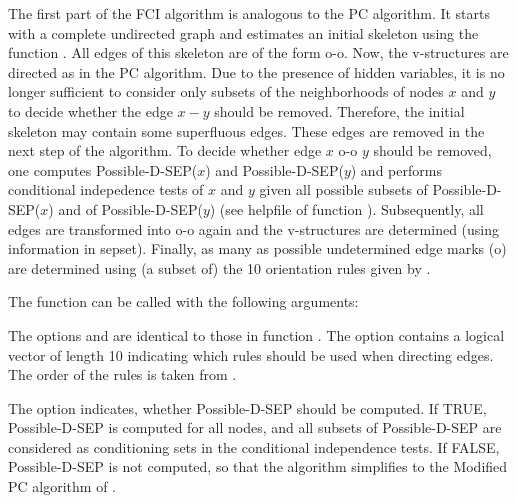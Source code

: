 \documentclass[article]{jss}
\begin{document}
The first part of the FCI algorithm is analogous to the PC algorithm. It
starts with a complete undirected graph and estimates an initial skeleton
using the function . All edges of this skeleton are of the
form o-o. Now, the v-structures are directed as in the PC algorithm. Due to the presence of hidden variables, it is no longer
sufficient to consider only subsets of the neighborhoods of nodes $x$ and
$y$ to decide whether the edge $x-y$ should be removed.  Therefore, the
initial skeleton may contain some superfluous edges.  These edges are
removed in the next step of the algorithm. To decide whether edge $x$ o-o $y$
should be removed, one computes Possible-D-SEP($x$) and Possible-D-SEP($y$)
and performs conditional indepedence tests of $x$ and $y$ given all
possible subsets of Possible-D-SEP($x$) and of Possible-D-SEP($y$) (see
helpfile of function ). Subsequently, all edges are transformed into o-o again and the v-structures are
determined (using information in sepset).  Finally, as many as possible
undetermined edge marks (o) are determined using (a subset of) the 10
orientation rules given by \cite{Zhang08-orientation-rules}.

The function can be called with the following arguments:

     
The options  and  are identical to those in function
. The option  contains a logical vector of
length 10 indicating which rules should be used when directing edges. The
order of the rules is taken from \cite{Zhang08-orientation-rules}.
     
The option  indicates, whether Possible-D-SEP should be
computed. If TRUE, Possible-D-SEP is computed for all nodes, and all
subsets of Possible-D-SEP are considered as conditioning sets in the
conditional independence tests. If FALSE, Possible-D-SEP is not computed,
so that the algorithm simplifies to the Modified PC algorithm of \cite{SpirtesEtAl00}.
\end{document}
